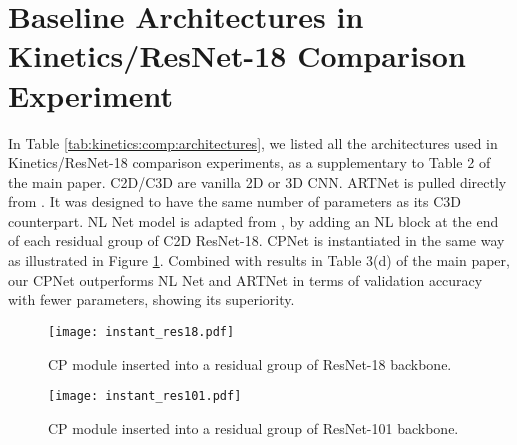 \documentclass[10pt,twocolumn,letterpaper]{article}
\begin{document}
\section{Baseline Architectures in Kinetics/ResNet-18 Comparison Experiment}
\label{sec:kinetics:comp}

In Table \ref{tab:kinetics:comp:architectures}, we listed all the architectures used in Kinetics/ResNet-18 comparison experiments, as a supplementary to Table 2 of the main paper. C2D/C3D are vanilla 2D or 3D CNN. ARTNet is pulled directly from \cite{ARTNet}. It was designed to have the same number of parameters as its C3D counterpart. NL Net model is adapted from \cite{NLNet}, by adding an NL block at the end of each residual group of C2D ResNet-18. CPNet is instantiated in the same way as illustrated in Figure \ref{fig:instant_res18}. Combined with results in Table 3(d) of the main paper, our CPNet outperforms NL Net and ARTNet in terms of validation accuracy with fewer parameters, showing its superiority.


\begin{figure}[t]
\centering
\texttt{[image: instant\_res18.pdf]}
\caption{CP module inserted into a residual group of ResNet-18 backbone.}
\vspace{-2ex}
\label{fig:instant_res18}
\vspace{-0ex}
\end{figure}
\begin{figure}[t]
\centering
\texttt{[image: instant\_res101.pdf]}
\caption{CP module inserted into a residual group of ResNet-101 backbone.}
\vspace{-2ex}
\label{fig:instant_res101}
\vspace{-0ex}
\end{figure}
\end{document}
